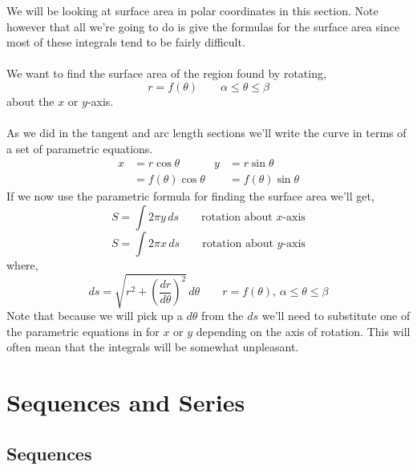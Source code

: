 \documentclass[10pt,reqno]{book}
\theoremstyle{definition}
\begin{document}
	We will be looking at surface area in polar coordinates in this section. Note however that all we're going to do is give the formulas for the surface area since most of these integrals tend to be fairly difficult.\\ \\
	We want to find the surface area of the region found by rotating,
	\[ r = f(\theta) \qquad \alpha \leq \theta \leq \beta  \]
	about the $ x $ or $ y $-axis.\\ \\
	As we did in the tangent and arc length sections we'll write the curve in terms of a set of parametric equations.
	\begin{align*}
		x &= r\cos\theta  &  y &= r\sin\theta\\
		&= f(\theta)\cos\theta  &  &= f(\theta) \sin\theta
	\end{align*}
	If we now use the parametric formula for finding the surface area we'll get,
	\[ S = \int 2\pi y\,ds \qquad \text{rotation about } x \text{-axis} \]
	\[ S = \int 2\pi x\,ds \qquad \text{rotation about } y \text{-axis} \]
	where,
	\[ ds = \sqrt{r^2 + \left( \frac{dr}{d\theta}\right)^2} \, d\theta \qquad r=f(\theta), \, \alpha \leq \theta \leq \beta \]
	Note that because we will pick up a $ d\theta $ from the $ ds $ we'll need to substitute one of the parametric equations in for $ x $ or $ y $ depending on the axis of rotation. This will often mean that the integrals will be somewhat unpleasant.
	
	
	
	\chapter{Sequences and Series}
	
	\section{Sequences}
	
\end{document}
